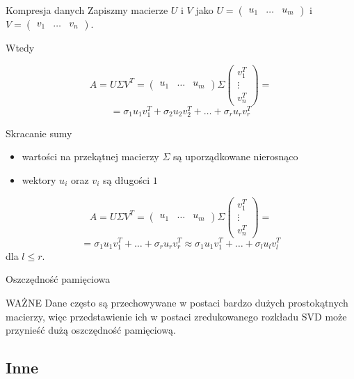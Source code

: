 \documentclass{beamer}
\begin{document}
\begin{frame}{Kompresja danych}
    Zapiszmy macierze $U$ i $V$ jako $U = \begin{pmatrix} u_1 & \ldots & u_m \end{pmatrix}$ i $V = \begin{pmatrix} v_1 & \ldots & v_n \end{pmatrix}$. \pause
    
    Wtedy

$$ A = U \Sigma V^T = \begin{pmatrix} u_1 & \ldots & u_m \end{pmatrix} \Sigma \begin{pmatrix}
v_1^T \\ \vdots \\ v_n^T
\end{pmatrix} =  $$ $$=\sigma_1 u_1 v_1^T + \sigma_2 u_2 v_2^T + \ldots + \sigma_r u_r v_r^T  $$
\end{frame}

\begin{frame}{Skracanie sumy}
    \begin{itemize}
    \item wartości na przekątnej macierzy $\Sigma$ są uporządkowane nierosnąco 
    \item wektory $u_i$ oraz $v_i$ są długości $1$
    \end{itemize}
    $$ A = U \Sigma V^T = \begin{pmatrix} u_1 & \ldots & u_m \end{pmatrix} \Sigma \begin{pmatrix}
v_1^T \\ \vdots \\ v_n^T
\end{pmatrix} =  $$ $$=\sigma_1 u_1 v_1^T + \ldots + \sigma_r u_r v_r^T  \approx \sigma_1 u_1 v_1^T  + \ldots + \sigma_l u_l v_l^T$$
dla $l \leq r$.
\end{frame}

\begin{frame}{Oszczędność pamięciowa}
\begin{block}{WAŻNE}
Dane często są przechowywane w postaci bardzo dużych prostokątnych macierzy, więc przedstawienie ich w postaci zredukowanego rozkładu SVD może przynieść dużą oszczędność pamięciową.
\end{block}
    
\end{frame}

\subsection{Inne}
\end{document}
